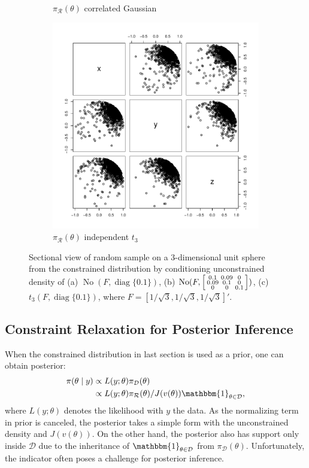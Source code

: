 \documentclass[10pt]{article}
\newcommand{\be}{\begin{equation}\begin{aligned}}
\newcommand{\ee}{\end{aligned}\end{equation}}
\newcommand{\mc}[1]{\mathcal{#1}}
\DeclareMathOperator{\No}{No}
\DeclareMathOperator{\diag}{diag}
\DeclareMathOperator{\1}{\mathbbm{1}}
\begin{document}
\begin{figure}[H]
\begin{subfigure}[b]{0.30\textwidth}
     \caption{$\pi_{\mc R}(\theta)$ correlated Gaussian}
     	\end{subfigure}
    \begin{subfigure}[b]{0.30\textwidth}
     \includegraphics[width=1\textwidth]{sphere_t}
     \caption{$\pi_{\mc R}(\theta)$ independent $t_3$}
     	\end{subfigure}
\caption{Sectional view of random sample on a 3-dimensional unit sphere from the constrained distribution by conditioning unconstrained density of (a) $\No( F, \diag\{0.1\})$, (b) $\No(F, \left[\protect\begin{smallmatrix} 0.1 & 0.09 & 0 \\ 0.09 & 0.1 & 0 \\ 0 & 0 &0.1  \protect\end{smallmatrix}\right])$, (c) $t_3(F,\diag\{0.1\} )$, where $F=[1/\sqrt{3},1/\sqrt{3},1/\sqrt{3}]'$.}
\label{sphere_examples}
\end{figure}

\subsection{Constraint Relaxation for Posterior Inference}

When the constrained distribution in last section is used as a prior,
one can obtain posterior:
\be
\label{exactPosterior}
\pi(\theta\mid y) & \propto L(y;\theta)\pi_{\mc D}(\theta) \\
				       & \propto L(y;\theta) \pi_{\mc
R}(\theta) /J(v(\theta))\mathbbm{1}_{\theta\in \mc D},
\ee
where $L(y;\theta)$ denotes the likelihood with $y$ the data. As the
normalizing term in prior is canceled, the posterior takes a simple form
with the unconstrained density and $J(v(\theta))$. On the other hand, the posterior also has support only inside $\mc D$ due to the inheritance of
$\mathbbm{1}_{\theta\in \mc D}$ from $\pi_{\mc D}(\theta)$. Unfortunately, the indicator often poses a challenge for posterior inference. 
\end{document}
